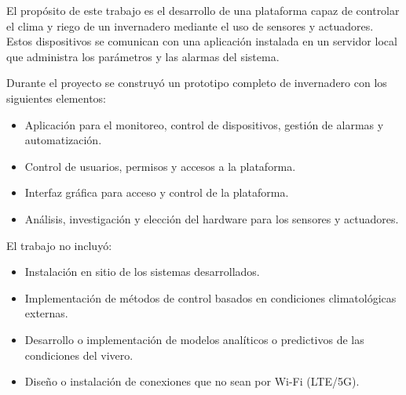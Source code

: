 El propósito de este trabajo es el desarrollo de una plataforma capaz de controlar el clima y riego de un invernadero mediante el uso de sensores y actuadores. Estos dispositivos se comunican con una aplicación instalada en un servidor local que administra los parámetros y las alarmas del sistema.

Durante el proyecto se construyó un prototipo completo de invernadero con los siguientes elementos:
 
\begin{itemize}
	\item Aplicación para el monitoreo, control de dispositivos, gestión de alarmas y automatización.
	\item Control de usuarios, permisos y accesos a la plataforma.
	\item Interfaz gráfica para acceso y control de la plataforma.
	\item Análisis, investigación y elección del hardware para los sensores y actuadores.


\end{itemize}


El trabajo no incluyó:
\begin{itemize}
	\item Instalación en sitio de los sistemas desarrollados.
	\item Implementación de métodos de control basados en condiciones climatológicas externas.
	\item Desarrollo o implementación de modelos analíticos o predictivos de las condiciones del vivero.
	\item Diseño o instalación de conexiones que no sean por Wi-Fi (LTE/5G). 
	
\end{itemize}